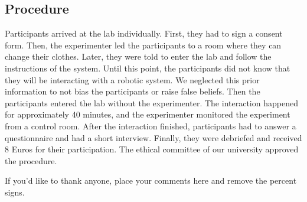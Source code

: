 \subsection{Procedure}
Participants arrived at the lab individually. 
First, they had to sign a consent form. 
Then, the experimenter led the participants to a room where they can change their clothes. 
Later, they were told to enter the lab and follow the instructions of the system. Until this point, the participants did not know that they will be interacting with a robotic system. We neglected this prior information to not bias the participants or raise false beliefs. Then the participants entered the lab without the experimenter. The interaction happened for approximately 40 minutes, and the experimenter monitored the experiment from a control room. After the interaction finished, participants had to answer a questionnaire and had a short interview. Finally, they were debriefed and received 8 Euros for their participation. The ethical committee of our university approved the procedure.

\begin{acknowledgements}
If you'd like to thank anyone, place your comments here
and remove the percent signs.
\end{acknowledgements}

\printbibliography{}





